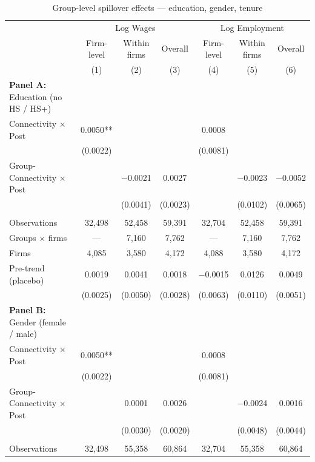 \begin{table}[H]
\centering
\caption{Group-level spillover effects --- education, gender, tenure}
\scriptsize
\begin{tabular}{lcccccc}
\toprule\toprule
 & \multicolumn{3}{c}{Log Wages} & \multicolumn{3}{c}{Log Employment} \\
\cmidrule(lr){2-4} \cmidrule(lr){5-7}
 & \shortstack{Firm-\\level} & \shortstack{Within\\firms} & Overall
 & \shortstack{Firm-\\level} & \shortstack{Within\\firms} & Overall \\
 & (1) & (2) & (3) & (4) & (5) & (6) \\
\midrule
\textbf{Panel A:} Education (no HS / HS+) &  &  &  &  &  &  \\
Connectivity $\times$ Post & 0.0050** &  &  & 0.0008 &  &  \\
 & (0.0022) &  &  & (0.0081) &  &  \\
Group-Connectivity $\times$ Post &  & $-$0.0021 & 0.0027 &  & $-$0.0023 & $-$0.0052 \\
 &  & (0.0041) & (0.0023) &  & (0.0102) & (0.0065) \\
 &  &  &  &  &  &  \\
Observations & 32{,}498 & 52{,}458 & 59{,}391 & 32{,}704 & 52{,}458 & 59{,}391 \\
Groups $\times$ firms & --- & 7{,}160 & 7{,}762 & --- & 7{,}160 & 7{,}762 \\
Firms & 4{,}085 & 3{,}580 & 4{,}172 & 4{,}088 & 3{,}580 & 4{,}172 \\
Pre-trend (placebo) & 0.0019 & 0.0041 & 0.0018 & $-$0.0015 & 0.0126 & 0.0049 \\
 & (0.0025) & (0.0050) & (0.0028) & (0.0063) & (0.0110) & (0.0051) \\
\midrule
\textbf{Panel B:} Gender (female / male) &  &  &  &  &  &  \\
Connectivity $\times$ Post & 0.0050** &  &  & 0.0008 &  &  \\
 & (0.0022) &  &  & (0.0081) &  &  \\
Group-Connectivity $\times$ Post &  & 0.0001 & 0.0026 &  & $-$0.0024 & 0.0016 \\
 &  & (0.0030) & (0.0020) &  & (0.0048) & (0.0044) \\
 &  &  &  &  &  &  \\
Observations & 32{,}498 & 55{,}358 & 60{,}864 & 32{,}704 & 55{,}358 & 60{,}864 \\

\end{tabular}
\end{table}

